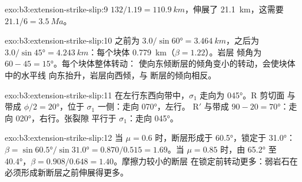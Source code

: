 \begin{solution}{exo:b3:extension-strike-slip:9}
$132/1.19 = \qty{110.9}{km}$，伸展了 \qty{21.1}{km}，这需要
$21.1/6 = \qty{3.5}{Ma}$。
\end{solution}

\begin{solution}{exo:b3:extension-strike-slip:10}
之前为 $3.0/\sin\ang{60} = \qty{3.464}{km}$，之后为 $3.0/\sin\ang{45} =
\qty{4.243}{km}$：每个块体 \qty{0.779}{km}（$\beta = 1.22$）。岩层
倾角为 $60 - 45 = \ang{15}$。每个块体整体转动：
使向东倾断层的倾角变小的转动，会使块体中的水平线
向东抬升，岩层向西倾，与
断层的倾向相反。
\end{solution}

\begin{solution}{exo:b3:extension-strike-slip:11}
在左行东西向带中，$\sigma_1$ 走向为 \ang{045}。R 剪切面
与带成 $\phi/2 = \ang{20}$，位于 $\sigma_1$ 一侧：走向 \ang{070}，左行。
R$'$ 与带成 $90 - 20 = \ang{70}$：走向 \ang{020}，右行。张裂隙
平行于 $\sigma_1$：走向 \ang{045}。
\end{solution}

\begin{solution}{exo:b3:extension-strike-slip:12}
当 $\mu = 0.6$ 时，断层形成于 \ang{60.5}，锁定于 \ang{31.0}：$\beta =
\sin\ang{60.5}/\sin\ang{31.0} = 0.870/0.515 = 1.69$。当 $\mu = 0.85$ 时，由
\ang{65.2} 至 \ang{40.4}，$\beta = 0.908/0.648 = 1.40$。摩擦力较小的断层
在锁定前转动更多：弱岩石在
必须形成新断层之前伸展得更多。
\end{solution}

